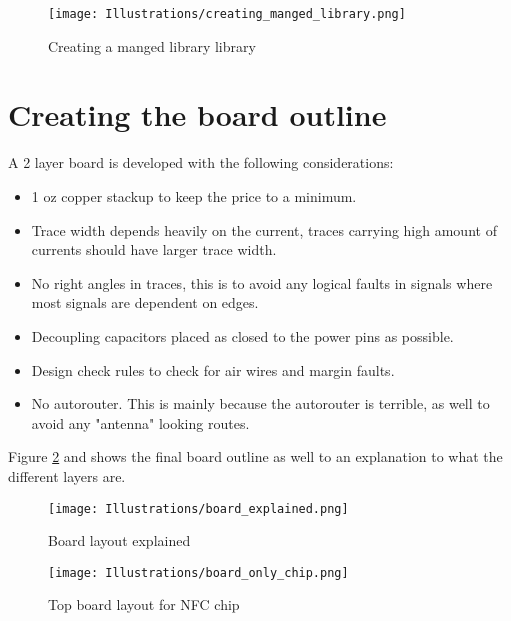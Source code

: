 \begin{figure}[h]
\begin{center}
\center
\texttt{[image: Illustrations/creating\_manged\_library.png]}  
\caption{Creating a manged library library}
\label{eagle_fusion}
\end{center}
\end{figure}



\section{Creating the board outline}
A 2 layer board is developed with the following considerations:
\begin{itemize}
\item 1 oz copper stackup to keep the price to a minimum.
\item Trace width depends heavily on the current, traces carrying high amount of currents should have larger trace width.
\item No right angles in traces, this is to avoid any logical faults in signals where most signals are dependent on edges. 
\item Decoupling capacitors placed as closed to the power pins as possible. 
\item Design check rules to check for air wires and margin faults.
\item No autorouter. This is mainly because the autorouter is terrible, as well to avoid any "antenna" looking routes.
\end{itemize}
Figure \ref{eagle_board} and  shows the final board outline as well to an explanation to what the different layers are.

\begin{figure}[h]
\begin{center}
\center
\texttt{[image: Illustrations/board\_explained.png]}  
\caption{Board layout explained}
\label{eagle_board}
\end{center}
\end{figure}

\begin{figure}[h]
\begin{center}
\center
\texttt{[image: Illustrations/board\_only\_chip.png]}  
\caption{Top board layout for NFC chip}
\label{only_chip}
\end{center}
\end{figure}


